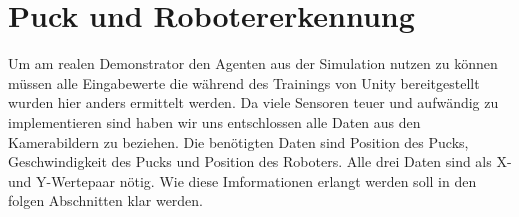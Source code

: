 \clearpage
\section{Puck und Robotererkennung}
\label{sect:puck_robo_erk}
Um am realen Demonstrator den Agenten aus der Simulation nutzen zu können müssen alle Eingabewerte die während des Trainings von Unity bereitgestellt wurden hier anders ermittelt werden. Da viele Sensoren teuer und aufwändig zu implementieren sind haben wir uns entschlossen alle Daten aus den Kamerabildern zu beziehen. Die benötigten Daten sind Position des Pucks, Geschwindigkeit des Pucks und Position des Roboters. Alle drei Daten sind als X- und Y-Wertepaar nötig. Wie diese Imformationen erlangt werden soll in den folgen Abschnitten klar werden.\\


